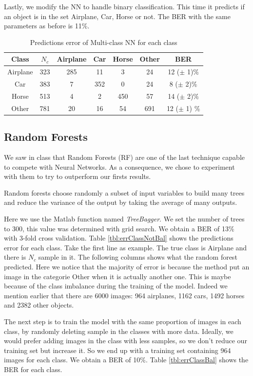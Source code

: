 \documentclass{article} %
\begin{document}
Lastly, we modify the NN to handle binary classification. This time it predicts if an object is in the set {Airplane, Car, Horse} or not. The BER with the same parameters as before is 11\%.

\begin{table}
	\centering
	\begin{tabular}{|c|c|c|c|c|c|c|}
		\hline Class & $N_{c}$ & Airplane & Car & Horse & Other & BER \\ 
		\hline Airplane	  & 323 & 285 & 11 & 3 & 24 & 12 ($\pm$ 1)\% \\ 
		\hline Car			& 383 & 7 & 352 & 0 & 24 &  8 ($\pm$ 2)\% \\ 
		\hline Horse      & 513 & 4 & 2 & 450 & 57 &  14 ($\pm$ 2)\% \\ 
		\hline Other      & 781 & 20 & 16 & 54 & 691 & 12 ($\pm$ 1) \% \\ 
		\hline 
	\end{tabular} 
	\caption{Predictions error of Multi-class NN for each class}
	\label{tbl:errClassNN}
\end{table}

\subsection{Random Forests}
We saw in class that Random Forests (RF) are one of the last technique capable to compete with Neural Networks.
As a consequence, we chose to experiment with them to try to outperform our firsts results.

Random forests choose randomly a subset of input variables to build many trees and reduce the variance of the output by taking the average of many outputs.

Here we use the Matlab function named \emph{TreeBagger}. We set the number of trees to 300, this value was determined with grid search.
We obtain a BER of 13\% with 3-fold cross validation. Table \ref{tbl:errClassNotBal} shows the predictions error for each class. Take the first line as example. The true class is Airplane and there is $N_c$ sample in it. The following columns shows what the random forest predicted.
Here we notice that the majority of error is because the method put an image in the categorie Other when it is actually another one.
This is maybe because of the class imbalance during the training of the model. Indeed we mention earlier that there are 6000 images: 964 airplanes, 1162 cars, 1492 horses and 2382 other objects.

The next step is to train the model with the same proportion of images in each class, by randomly deleting sample in the classes with more data. Ideally, we would prefer adding images in the class with less samples, so we don't reduce our training set but increase it.
So we end up with a training set containing 964 images for each class. 
We obtain a BER of 10\%. Table \ref{tbl:errClassBal} shows the BER for each class.
\end{document}
